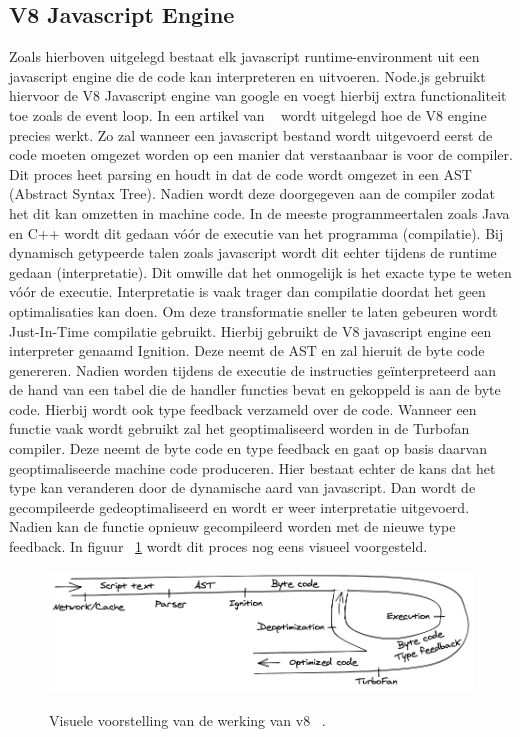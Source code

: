 \subsection{V8 Javascript Engine}
Zoals hierboven uitgelegd bestaat elk javascript runtime-environment uit een javascript engine die de code kan interpreteren en uitvoeren.
Node.js gebruikt hiervoor de V8 Javascript engine van google en voegt hierbij extra functionaliteit toe zoals de event loop.
In een artikel van ~\textcite{Lyamkin2020} wordt uitgelegd hoe de V8 engine precies werkt. 
Zo zal wanneer een javascript bestand wordt uitgevoerd eerst de code moeten omgezet worden op een manier dat verstaanbaar is voor de compiler.
Dit proces heet parsing en houdt in dat de code wordt omgezet in een AST (Abstract Syntax Tree). 
Nadien wordt deze doorgegeven aan de compiler zodat het dit kan omzetten in machine code. 
In de meeste programmeertalen zoals Java en C++ wordt dit gedaan vóór de executie van het programma (compilatie).
Bij dynamisch getypeerde talen zoals javascript wordt dit echter tijdens de runtime gedaan (interpretatie). 
Dit omwille dat het onmogelijk is het exacte type te weten vóór de executie.
Interpretatie is vaak trager dan compilatie doordat het geen optimalisaties kan doen.
Om deze transformatie sneller te laten gebeuren wordt Just-In-Time compilatie gebruikt.
Hierbij gebruikt de V8 javascript engine een interpreter genaamd Ignition. Deze neemt de AST en zal hieruit de byte code genereren.
Nadien worden tijdens de executie de instructies geïnterpreteerd aan de hand van een tabel die de handler functies bevat en gekoppeld is aan de byte code.
Hierbij wordt ook type feedback verzameld over de code. 
Wanneer een functie vaak wordt gebruikt zal het geoptimaliseerd worden in de Turbofan compiler.
Deze neemt de byte code en type feedback en gaat op basis daarvan geoptimaliseerde machine code produceren.
Hier bestaat echter de kans dat het type kan veranderen door de dynamische aard van javascript. 
Dan wordt de gecompileerde gedeoptimaliseerd en wordt er weer interpretatie uitgevoerd.
Nadien kan de functie opnieuw gecompileerd worden met de nieuwe type feedback.
In figuur ~\ref{fig:v8} wordt dit proces nog eens visueel voorgesteld.
\begin{figure}[h]
    \centering
    \includegraphics[width=.9\textwidth]{graphics/v8.png}
    \caption{\label{fig:v8}}Visuele voorstelling van de werking van v8 ~\autocite{Lyamkin2020}.
\end{figure}

